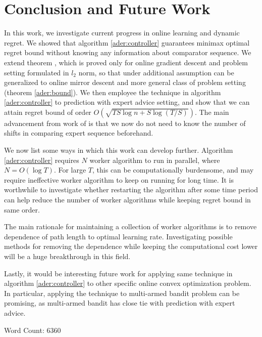 \documentclass[12pt, a4paper]{report}
\begin{document}
\chapter{Conclusion and Future Work}
\label{Chap4}
In this work, we investigate current progress in online learning and dynamic regret. We showed that algorithm \ref{ader:controller} guarantees minimax optimal regret bound without knowing any information about comparator sequence. We extend theorem \cite[Theorem 3]{Zhang2018AdaptiveOL}, which is proved only for online gradient descent and problem setting formulated in $l_2$ norm, so that under additional assumption can be generalized to online mirror descent and more general class of problem setting (theorem \ref{ader:bound}). We then employee the technique in algorithm \ref{ader:controller} to prediction with expert advice setting, and show that we can attain regret bound of order $O(\sqrt{TS\log n +S\log(T/S)})$. The main advancement from work of \cite{Herbster1995TrackingTB} is that we now do not need to know the number of shifts in comparing expert sequence beforehand.

We now list some ways in which this work can develop further. Algorithm \ref{ader:controller} requires $N$ worker algorithm to run in parallel, where $N = O(\log T)$. For large $T$, this can be computationally burdensome, and may require ineffective worker algorithm to keep on running for long time. It is worthwhile to investigate whether restarting the algorithm after some time period can help reduce the number of worker algorithms while keeping regret bound in same order. 

The main rationale for maintaining a collection of worker algorithms is to remove dependence of path length to optimal learning rate. Investigating possible methods for removing the dependence while keeping the computational cost lower will be a huge breakthrough in this field. 

Lastly, it would be interesting future work for applying same technique in algorithm \ref{ader:controller} to other specific online convex optimization problem. In particular, applying the technique to multi-armed bandit problem can be promising, as multi-armed bandit has close tie with prediction with expert advice. 

\small{Word Count: 6360}

\renewcommand{\bibname}{Bibliography}


\end{document}
